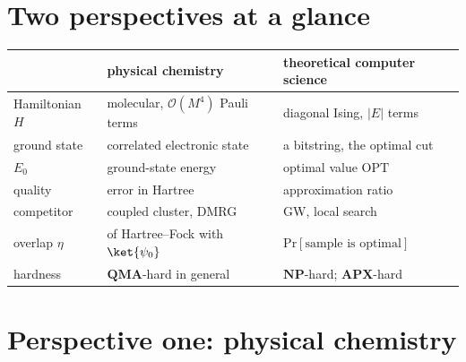 \documentclass[handoutsbeamer.tex]{subfiles}
\begin{document}
\section{Two perspectives at a glance}

\begin{frame}
\onp{\scriptsize}
\begin{center}\ona{\small}
\begin{tabular}{lll}\toprule
 & physical chemistry & theoretical computer science \\\midrule
Hamiltonian $H$ & molecular, $\mathcal O(M^4)$ Pauli terms & diagonal Ising, $|E|$ terms \\
ground state & correlated electronic state & a bitstring, the optimal cut \\
$E_0$ & ground-state energy & optimal value $\mathrm{OPT}$ \\
quality & error in Hartree & approximation ratio \\
competitor & coupled cluster, DMRG & GW, local search \\
overlap $\eta$ & of Hartree--Fock with $\ket{\psi_0}$ & $\mathrm{Pr}[\text{sample is optimal}]$ \\
hardness & $\mathbf{QMA}$-hard in general & $\mathbf{NP}$-hard; $\mathbf{APX}$-hard \\\bottomrule
\end{tabular}
\end{center}
\end{frame}

\section{Perspective one: physical chemistry}
\end{document}
